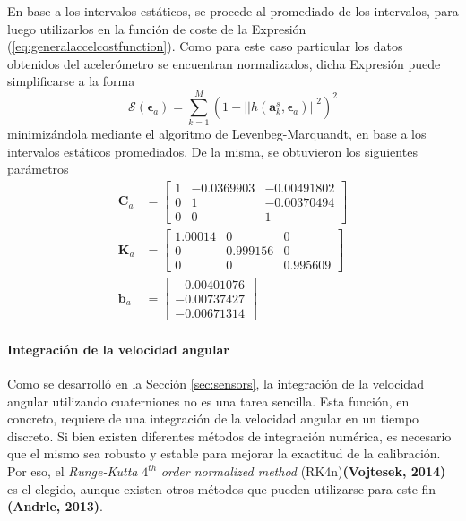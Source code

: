 En base a los intervalos estáticos, se procede al promediado de los intervalos, para luego utilizarlos en la función de coste de la Expresión (\ref{eq:generalaccelcostfunction}). Como para este caso particular los datos obtenidos del acelerómetro se encuentran normalizados, dicha Expresión puede simplificarse a la forma
\begin{equation}
    \mathscr{S}(\bm{\epsilon}_{a}) = \sum_{k=1}^M(1-||h(\bm{a}^s_k,\bm{\epsilon}_{a})||^2)^2
    \label{eq:mpu9250accelcostfunction}
\end{equation}
minimizándola mediante el algoritmo de Levenbeg-Marquandt, en base a los intervalos estáticos promediados. De la misma, se obtuvieron los siguientes parámetros
\begin{align}
        \bm{C}_a &=
    \begin{bmatrix}
        1 & -0.0369903 & -0.00491802 \\
        0 & 1 & -0.00370494 \\
        0 & 0 & 1
    \end{bmatrix}
    \\
        \bm{K}_a &=
    \begin{bmatrix}
        1.00014 & 0 & 0 \\
        0 & 0.999156 & 0 \\
        0 & 0 & 0.995609
    \end{bmatrix}
    \\
    \bm{b}_a &=
    \begin{bmatrix}
        -0.00401076 \\
        -0.00737427 \\
        -0.00671314
    \end{bmatrix}
\end{align}

\paragraph{Integración de la velocidad angular}
Como se desarrolló en la Sección \ref{sec:sensors}, la integración de la velocidad angular utilizando cuaterniones no es una tarea sencilla.
Esta función, en concreto, requiere de una integración de la velocidad angular en un tiempo discreto. Si bien existen diferentes métodos de integración numérica, es necesario que el mismo sea robusto y estable para mejorar la exactitud de la calibración. Por eso, el \textit{Runge-Kutta} $4^{th}$ \textit{order normalized method} (RK4n)\textbf{(Vojtesek, 2014)} es el elegido, aunque existen otros métodos que pueden utilizarse para este fin \textbf{(Andrle, 2013)}.

